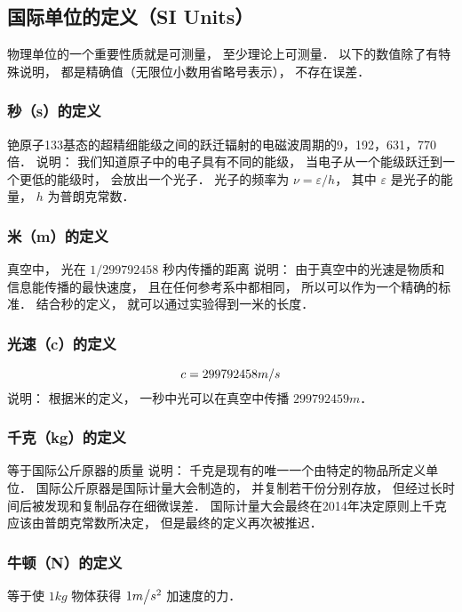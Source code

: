 
\subsection{国际单位的定义（SI Units）}

物理单位的一个重要性质就是可测量， 至少理论上可测量． 以下的数值除了有特殊说明， 都是精确值（无限位小数用省略号表示）， 不存在误差．

\subsubsection{秒（s）的定义}
铯原子133基态的超精细能级之间的跃迁辐射的电磁波周期的9，192，631，770倍． 
说明： 我们知道原子中的电子具有不同的能级， 当电子从一个能级跃迁到一个更低的能级时， 会放出一个光子． 光子的频率为 $\nu  = \varepsilon /h$，   其中 $\varepsilon $ 是光子的能量， $h$ 为普朗克常数．

\subsubsection{米（m）的定义}
真空中， 光在 $1/299792458$ 秒内传播的距离
说明： 由于真空中的光速是物质和信息能传播的最快速度， 且在任何参考系中都相同， 所以可以作为一个精确的标准． 结合秒的定义， 就可以通过实验得到一米的长度．

\subsubsection{光速（c）的定义}
 \begin{equation}
c = 299792458{m \mathord{\left/
 {\vphantom {m s}} \right.
 \kern-\nulldelimiterspace} s}
\end{equation} 
说明： 根据米的定义， 一秒中光可以在真空中传播 $299792459  m$．  

\subsubsection{千克（kg）的定义}
等于国际公斤原器的质量
说明： 千克是现有的唯一一个由特定的物品所定义单位． 国际公斤原器是国际计量大会制造的， 并复制若干份分别存放， 但经过长时间后被发现和复制品存在细微误差． 国际计量大会最终在2014年决定原则上千克应该由普朗克常数所决定， 但是最终的定义再次被推迟．

\subsubsection{牛顿（N）的定义}
等于使 $1kg$ 物体获得 $1{m \mathord{\left/
 {\vphantom {m {{s^2}}}} \right.
 \kern-\nulldelimiterspace} {{s^2}}}$ 加速度的力．


